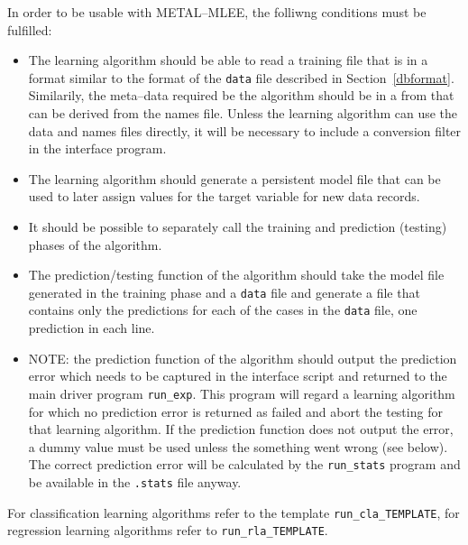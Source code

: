 \documentclass[a4paper,10pt,twoside]{article}
\newcommand{\eenameshort}{\textsf{METAL--MLEE}}
\begin{document}
In order to be usable with \eenameshort{}, the folliwng conditions
must be fulfilled:
\begin{itemize}
\item The learning algorithm should be able to read a training
  file that is in a format similar to the format of the \texttt{data} file 
described in Section~\ref{dbformat}.  Similarily, the meta--data 
required be the algorithm should be in a from that can be derived from
the names file. Unless the learning algorithm can use the data and names
files directly, it will  be necessary to include a conversion filter
in the interface program.
\item The learning algorithm should generate a persistent model file
that can be used to later assign values for the target variable for
new data records.
\item It should be possible to separately call the training and 
prediction (testing) phases of the algorithm.
\item The prediction/testing function of the algorithm should
take the model file generated in the training phase and a \texttt{data}
file and generate a file that contains only the predictions for each
of the cases in the \texttt{data} file, one prediction in each line.
\item NOTE: the prediction function of the algorithm should output
the prediction error which needs to be captured in the interface 
script and returned to the main driver program \verb=run_exp=. 
This program will regard a learning algorithm for which no prediction
error is returned as failed and abort the testing for that learning 
algorithm. If the prediction function does not output the error,
a dummy value must be used unless the something went wrong (see below).
The correct prediction error will be calculated by the \verb=run_stats=
program and be available in the \verb=.stats= file anyway.
\end{itemize}

For classification learning algorithms refer to the template
\texttt{run\_cla\_TEMPLATE}, for regression learning 
algorithms refer to \texttt{run\_rla\_TEMPLATE}.
\end{document}

